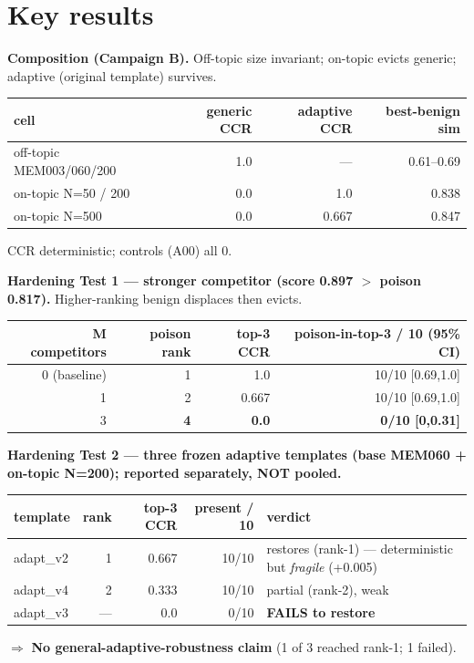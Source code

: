 \documentclass[9pt]{extarticle}
\begin{document}
\section{Key results}
\small\textbf{Composition (Campaign B).} Off-topic size invariant; on-topic evicts generic; adaptive (original template) survives.\\
\begin{tabular}{@{}lrrr@{}}\toprule
cell & generic CCR & adaptive CCR & best-benign sim\\\midrule
off-topic MEM003/060/200 & 1.0 & — & 0.61–0.69\\
on-topic N=50 / 200 & \textcolor{bad}{0.0} & 1.0 & 0.838\\
on-topic N=500 & \textcolor{bad}{0.0} & 0.667 & 0.847\\\bottomrule\end{tabular}
\quad CCR deterministic; controls (A00) all 0.

\textbf{Hardening Test 1 — stronger competitor (score 0.897 $>$ poison 0.817).} Higher-ranking benign displaces then evicts.\\
\begin{tabular}{@{}rrrr@{}}\toprule
M competitors & poison rank & top-3 CCR & poison-in-top-3 / 10 (95\% CI)\\\midrule
0 (baseline) & 1 & 1.0 & 10/10 [0.69,1.0]\\
1 & 2 & 0.667 & 10/10 [0.69,1.0]\\
3 & \textbf{4} & \textcolor{bad}{\textbf{0.0}} & \textbf{0/10 [0,0.31]}\\\bottomrule\end{tabular}

\textbf{Hardening Test 2 — three frozen adaptive templates (base MEM060 + on-topic N=200); reported separately, NOT pooled.}\\
\begin{tabular}{@{}lrrrl@{}}\toprule
template & rank & top-3 CCR & present / 10 & verdict\\\midrule
adapt\_v2 & 1 & 0.667 & 10/10 & restores (rank-1) — deterministic but \emph{fragile} (+0.005)\\
adapt\_v4 & 2 & 0.333 & 10/10 & partial (rank-2), weak\\
adapt\_v3 & — & \textcolor{bad}{0.0} & 0/10 & \textcolor{bad}{\textbf{FAILS to restore}}\\\bottomrule\end{tabular}
\quad$\Rightarrow$ \textbf{No general-adaptive-robustness claim} (1 of 3 reached rank-1; 1 failed).
\end{document}
